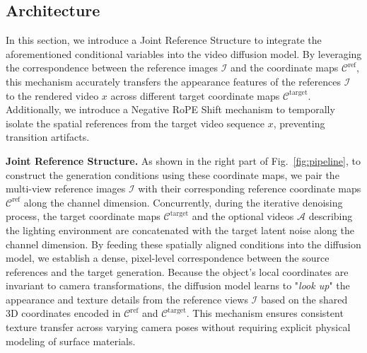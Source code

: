 \documentclass[runningheads]{llncs}
\begin{document}
\subsection{Architecture}
\label{sec:architecture}

In this section, we introduce a Joint Reference Structure to integrate the aforementioned conditional variables into the video diffusion model. By leveraging the correspondence between the reference images $\mathcal{I}$ and the coordinate maps $\mathcal{C}^{\text{ref}}$, this mechanism accurately transfers the appearance features of the references $\mathcal{I}$ to the rendered video $x$ across different target coordinate maps $\mathcal{C}^{\text{target}}$. Additionally, we introduce a Negative RoPE Shift mechanism to temporally isolate the spatial references from the target video sequence $x$, preventing transition artifacts.

\textbf{Joint Reference Structure.}
As shown in the right part of Fig.~\ref{fig:pipeline}, to construct the generation conditions using these coordinate maps, we pair the multi-view reference images $\mathcal{I}$ with their corresponding reference coordinate maps $\mathcal{C}^{\text{ref}}$ along the channel dimension. Concurrently, during the iterative denoising process, the target coordinate maps $\mathcal{C}^{\text{target}}$ and the optional videos $\mathcal{A}$ describing the lighting environment are concatenated with the target latent noise along the channel dimension. By feeding these spatially aligned conditions into the diffusion model, we establish a dense, pixel-level correspondence between the source references and the target generation. Because the object's local coordinates are invariant to camera transformations, the diffusion model learns to "\textit{look up}" the appearance and texture details from the reference views $\mathcal{I}$ based on the shared 3D coordinates encoded in $\mathcal{C}^{\text{ref}}$ and $\mathcal{C}^{\text{target}}$. This mechanism ensures consistent texture transfer across varying camera poses without requiring explicit physical modeling of surface materials.
\end{document}

